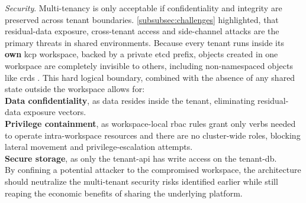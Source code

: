 \documentclass[11pt, a4paper, oneside, listof=totoc]{scrartcl}
\begin{document}
\begin{enumerate}[label={[\arabic*]:},
                    ref=Challenge~\arabic*,
                    leftmargin=*,
                    itemsep=0.6\baselineskip]
                    \item\label{chal:architectureSecurity}
                        \textit{Security}.
                        Multi-tenancy is only acceptable if confidentiality and integrity are
                        preserved across tenant boundaries.
                        \autoref{subsubsec:challenges} highlighted, that residual-data exposure,
                        cross-tenant access and side-channel attacks are the primary threats in
                        shared environments.
                        Because every tenant runs inside its \textbf{own} \gls{kcp} workspace,
                        backed by a private \gls{etcd} prefix, objects created in one workspace are
                        completely invisible to others, including non-namespaced objects like
                        \glspl{crd} \parencite{kcpWorkspaces}.
                        This hard logical boundary, combined with the absence of any shared state
                        outside the workspace allows for:
                        \\
                        \textbf{Data confidentiality}, as data resides inside the tenant,
                        eliminating residual-data exposure vectors.
                        \\
                        \textbf{Privilege containment}, as workspace-local \gls{rbac} rules grant
                        only verbs needed to operate intra-workspace resources and there are no
                        cluster-wide roles, blocking lateral movement and privilege-escalation
                        attempts.
                        \\
                        \textbf{Secure storage}, as only the tenant-\gls{api} has write access on
                        the tenant-\gls{db}.
                        \\
                        By confining a potential attacker to the compromised workspace, the
                        architecture should neutralize the multi-tenant security risks identified
                        earlier while still reaping the economic benefits of sharing the underlying
                        platform.
                        
                \end{enumerate}
\end{document}
